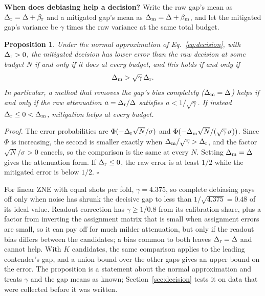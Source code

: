 \documentclass[10pt,twocolumn]{article}
\newcommand{\paragraphlead}[1]{\textbf{#1}\quad}
\begin{document}
\paragraphlead{When does debiasing help a decision?}
Write the raw gap's mean as $\Delta_{\rm r}=\Delta+\beta_{\rm r}$ and a mitigated gap's mean as
$\Delta_{\rm m}=\Delta+\beta_{\rm m}$, and let the mitigated gap's variance be $\gamma$ times the raw
variance at the same total budget.

\newtheorem{proposition}{Proposition}
\begin{proposition}\label{prop:help}
Under the normal approximation of Eq.~\eqref{eq:decision}, with $\Delta_{\rm r}>0$, the mitigated
decision has lower error than the raw decision at some budget $N$ if and only if it does at every
budget, and this holds if and only if
\begin{equation}
\Delta_{\rm m}>\sqrt{\gamma}\,\Delta_{\rm r}.
\label{eq:help}
\end{equation}
In particular, a method that removes the gap's bias completely ($\Delta_{\rm m}=\Delta$) helps if and
only if the raw attenuation $a=\Delta_{\rm r}/\Delta$ satisfies $a<1/\sqrt\gamma$. If instead
$\Delta_{\rm r}\le0<\Delta_{\rm m}$, mitigation helps at every budget.
\end{proposition}
\noindent\emph{Proof.} The error probabilities are $\Phi(-\Delta_{\rm r}\sqrt N/\sigma)$ and
$\Phi(-\Delta_{\rm m}\sqrt N/(\sqrt\gamma\,\sigma))$. Since $\Phi$ is increasing, the second is smaller
exactly when $\Delta_{\rm m}/\sqrt\gamma>\Delta_{\rm r}$, and the factor $\sqrt N/\sigma>0$ cancels,
so the comparison is the same at every $N$. Setting $\Delta_{\rm m}=\Delta$ gives the attenuation
form. If $\Delta_{\rm r}\le0$, the raw error is at least $1/2$ while the mitigated error is below
$1/2$. $\square$

For linear ZNE with equal shots per fold, $\gamma=4.375$, so complete debiasing pays off only when
noise has shrunk the decisive gap to less than $1/\sqrt{4.375}=0.48$ of its ideal value. Readout
correction has $\gamma\ge1/0.8$ from its calibration share, plus a factor from inverting the
assignment matrix that is small when assignment errors are small, so it can pay off for much milder
attenuation, but only if the readout bias differs between the candidates; a bias common to both
leaves $\Delta_{\rm r}=\Delta$ and cannot help. With $K$ candidates, the same comparison applies to
the leading contender's gap, and a union bound over the other gaps gives an upper bound on the error.
The proposition is a statement about the normal approximation and treats $\gamma$ and the gap means
as known; Section~\ref{sec:decision} tests it on data that were collected before it was written.
\end{document}
